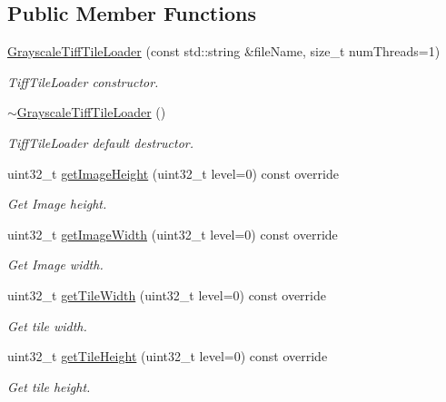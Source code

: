 \subsection*{Public Member Functions}
\begin{DoxyCompactItemize}
\item 
\hyperlink{classfi_1_1GrayscaleTiffTileLoader_ab2126146a3943c3ec2bd3004b01212c9}{Grayscale\+Tiff\+Tile\+Loader} (const std\+::string \&file\+Name, size\+\_\+t num\+Threads=1)
\begin{DoxyCompactList}\small\item\em Tiff\+Tile\+Loader constructor. \end{DoxyCompactList}\item 
\hyperlink{classfi_1_1GrayscaleTiffTileLoader_aa99f545172b6f7b47e66d7131b189db1}{$\sim$\+Grayscale\+Tiff\+Tile\+Loader} ()
\begin{DoxyCompactList}\small\item\em Tiff\+Tile\+Loader default destructor. \end{DoxyCompactList}\item 
uint32\+\_\+t \hyperlink{classfi_1_1GrayscaleTiffTileLoader_aedb905b521b888c68a59d20695c33e51}{get\+Image\+Height} (uint32\+\_\+t level=0) const override
\begin{DoxyCompactList}\small\item\em Get Image height. \end{DoxyCompactList}\item 
uint32\+\_\+t \hyperlink{classfi_1_1GrayscaleTiffTileLoader_ab20446c55b7ae2fea97490e76a73f934}{get\+Image\+Width} (uint32\+\_\+t level=0) const override
\begin{DoxyCompactList}\small\item\em Get Image width. \end{DoxyCompactList}\item 
uint32\+\_\+t \hyperlink{classfi_1_1GrayscaleTiffTileLoader_a273613b0ebb48732c449399fac614ebd}{get\+Tile\+Width} (uint32\+\_\+t level=0) const override
\begin{DoxyCompactList}\small\item\em Get tile width. \end{DoxyCompactList}\item 
uint32\+\_\+t \hyperlink{classfi_1_1GrayscaleTiffTileLoader_aa1ac88ed6b9505d5c98b9202e6f1ee6d}{get\+Tile\+Height} (uint32\+\_\+t level=0) const override
\begin{DoxyCompactList}\small\item\em Get tile height. \end{DoxyCompactList}\item 

\end{DoxyCompactItemize}
